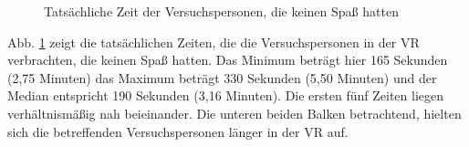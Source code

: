 \documentclass{Paper}
\begin{document}
        \begin{figure}[H]
  \caption{Tatsächliche Zeit der Versuchspersonen, die keinen Spaß hatten}
  \label{ZeitKeinSpass}
        \end{figure}
        
        Abb. \ref{ZeitKeinSpass} zeigt die tatsächlichen Zeiten, die die Versuchspersonen in der VR verbrachten, die keinen Spaß hatten. Das Minimum beträgt hier 165 Sekunden (2,75 Minuten) das Maximum beträgt 330 Sekunden (5,50 Minuten) und der Median entspricht 190 Sekunden (3,16 Minuten). Die ersten fünf Zeiten liegen verhältnismäßig nah beieinander. Die unteren beiden Balken betrachtend, hielten sich die betreffenden Versuchspersonen länger in der VR auf. 

\clearpage
\end{document}

